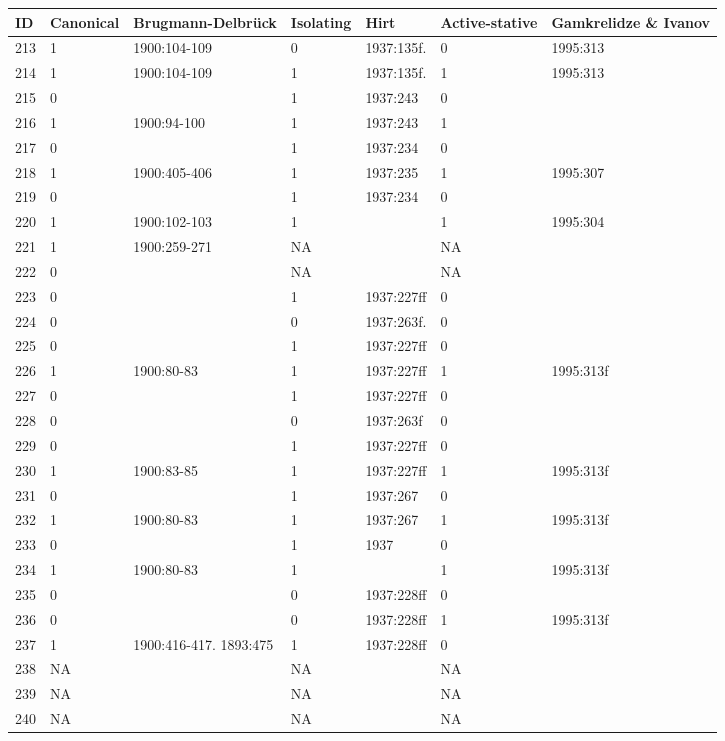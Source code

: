 {\scriptsize 
\begin{longtable}{p{.04\linewidth}p{.1\linewidth}p{.16\linewidth}p{.08\linewidth}p{.16\linewidth}p{.08\linewidth}p{.16\linewidth}}
ID & Canonical & Brugmann-{Delbr\"{u}ck} & Isolating & Hirt & Active-stative & Gamkrelidze \& Ivanov\\
\hline
213 & 1 & 1900:104-109 & 0 & 1937:135f. & 0 & 1995:313\\
214 & 1 & 1900:104-109 & 1 & 1937:135f. & 1 & 1995:313\\
215 & 0 &  & 1 & 1937:243 & 0 & \\
216 & 1 & 1900:94-100 & 1 & 1937:243 & 1 & \\
217 & 0 &  & 1 & 1937:234 & 0 & \\
218 & 1 & 1900:405-406 & 1 & 1937:235 & 1 & 1995:307\\
219 & 0 &  & 1 & 1937:234 & 0 & \\
220 & 1 & 1900:102-103 & 1 &  & 1 & 1995:304\\
221 & 1 & 1900:259-271 & NA &  & NA & \\
222 & 0 &  & NA &  & NA & \\
223 & 0 &  & 1 & 1937:227ff & 0 & \\
224 & 0 &  & 0 & 1937:263f. & 0 & \\
225 & 0 &  & 1 & 1937:227ff & 0 & \\
226 & 1 & 1900:80-83 & 1 & 1937:227ff & 1 & 1995:313f\\
227 & 0 &  & 1 & 1937:227ff & 0 & \\
228 & 0 &  & 0 & 1937:263f & 0 & \\
229 & 0 &  & 1 & 1937:227ff & 0 & \\
230 & 1 & 1900:83-85 & 1 & 1937:227ff & 1 & 1995:313f\\
231 & 0 &  & 1 & 1937:267 & 0 & \\
232 & 1 & 1900:80-83 & 1 & 1937:267 & 1 & 1995:313f\\
233 & 0 &  & 1 & 1937 & 0 & \\
234 & 1 & 1900:80-83 & 1 &  & 1 & 1995:313f\\
235 & 0 &  & 0 & 1937:228ff & 0 & \\
236 & 0 &  & 0 & 1937:228ff & 1 & 1995:313f\\
237 & 1 & 1900:416-417. 1893:475 & 1 & 1937:228ff & 0 & \\
238 & NA &  & NA &  & NA & \\
239 & NA &  & NA &  & NA & \\
240 & NA &  & NA &  & NA & \\

\end{longtable}}
